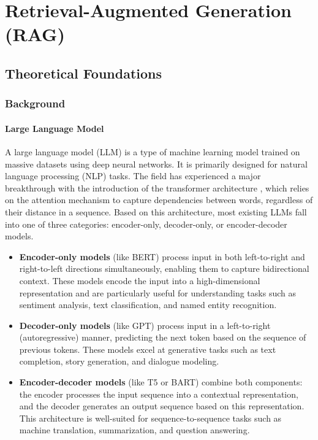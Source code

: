 \chapter{Retrieval-Augmented Generation (RAG)}

\section{Theoretical Foundations}
    \subsection{Background}
        \subsubsection{Large Language Model}
         A large language model (LLM) is a type of machine learning model trained on massive datasets using deep neural networks. It is primarily designed for natural language processing (NLP) tasks. The field has experienced a major breakthrough with the introduction of the transformer architecture \cite{transformers}, which relies on the attention mechanism to capture dependencies between words, regardless of their distance in a sequence. Based on this architecture, most existing LLMs fall into one of three categories: encoder-only, decoder-only, or encoder-decoder models.
     \begin{itemize}
        \item \textbf{Encoder-only models} (like BERT) process input in both left-to-right and right-to-left directions simultaneously, enabling them to capture bidirectional context. These models encode the input into a high-dimensional representation and are particularly useful for understanding tasks such as sentiment analysis, text classification, and named entity recognition.
        \item \textbf{Decoder-only models} (like GPT) process input in a left-to-right (autoregressive) manner, predicting the next token based on the sequence of previous tokens. These models excel at generative tasks such as text completion, story generation, and dialogue modeling.
        \item \textbf{Encoder-decoder models} (like T5 or BART) combine both components: the encoder processes the input sequence into a contextual representation, and the decoder generates an output sequence based on this representation. This architecture is well-suited for sequence-to-sequence tasks such as machine translation, summarization, and question answering.
    \end{itemize}
